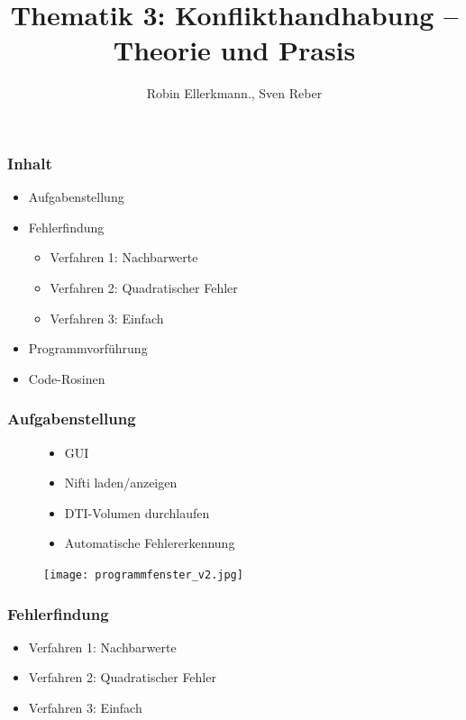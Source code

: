 \documentclass[12pt,a4paper]{beamer}
\author{Robin Ellerkmann., Sven Reber}
\title{Thematik 3: Konflikthandhabung -- Theorie und Prasis}
\begin{document}
\maketitle

\begin{frame}
	\frametitle{Inhalt}
	
	\begin{itemize}
		\item Aufgabenstellung
		\item Fehlerfindung
		\begin{itemize}
			\item Verfahren 1: Nachbarwerte
			\item Verfahren 2: Quadratischer Fehler
			\item Verfahren 3: Einfach
		\end{itemize}
		\item Programmvorf\"uhrung
		\item Code-Rosinen
	\end{itemize}
\end{frame}

\begin{frame}
	\frametitle{Aufgabenstellung}
	
	\begin{figure}
		\begin{minipage}{0.45\linewidth}
			\begin{itemize}
				\item GUI
				\item Nifti laden/anzeigen
				\item DTI-Volumen durchlaufen
				\item Automatische Fehlererkennung
			\end{itemize}
		\end{minipage}
		\begin{minipage}{0.45\linewidth}
			\texttt{[image: programmfenster\_v2.jpg]} 
		\end{minipage}
	\end{figure}

\end{frame}


\begin{frame}
	\frametitle{Fehlerfindung}
	\begin{itemize}
		\item Verfahren 1: Nachbarwerte
		\item Verfahren 2: Quadratischer Fehler
		\item Verfahren 3: Einfach
	\end{itemize}
\end{frame}
\end{document}
